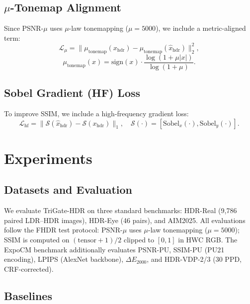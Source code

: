 \documentclass[10pt,twocolumn,letterpaper]{article}
\newcommand{\xhdr}{x_{\mathrm{hdr}}}
\begin{document}
\subsection{$\mu$-Tonemap Alignment}

Since PSNR-$\mu$ uses $\mu$-law tonemapping ($\mu=5000$), we include a metric-aligned term:
\begin{equation}
\mathcal{L}_{\mu} = \|\mu_{\mathrm{tonemap}}(\xhdr) - \mu_{\mathrm{tonemap}}(\hat x_{\mathrm{hdr}})\|_2^2,
\label{eq:mu-loss}
\end{equation}
\begin{equation}
\mu_{\mathrm{tonemap}}(x) = \mathrm{sign}(x)\cdot\frac{\log(1+\mu|x|)}{\log(1+\mu)}.
\label{eq:mu-tonemap}
\end{equation}

\subsection{Sobel Gradient (HF) Loss}

To improve SSIM, we include a high-frequency gradient loss:
\begin{equation}
\mathcal{L}_{\mathrm{hf}} = \|\mathcal{S}(\hat x_{\mathrm{hdr}}) - \mathcal{S}(\xhdr)\|_1, \quad \mathcal{S}(\cdot) = [\mathrm{Sobel}_x(\cdot), \mathrm{Sobel}_y(\cdot)].
\label{eq:hf-loss}
\end{equation}

\section{Experiments}
\label{sec:experiments}

\subsection{Datasets and Evaluation}

We evaluate TriGate-HDR on three standard benchmarks: HDR-Real (9{,}786 paired LDR--HDR images), HDR-Eye (46 pairs), and AIM2025. All evaluations follow the FHDR test protocol: PSNR-$\mu$ uses $\mu$-law tonemapping ($\mu=5000$); SSIM is computed on $(\mathrm{tensor}+1)/2$ clipped to $[0,1]$ in HWC RGB. The ExpoCM benchmark additionally evaluates PSNR-PU, SSIM-PU (PU21 encoding), LPIPS (AlexNet backbone), $\Delta E_{2000}$, and HDR-VDP-2/3 (30 PPD, CRF-corrected).

\subsection{Baselines}
\end{document}
